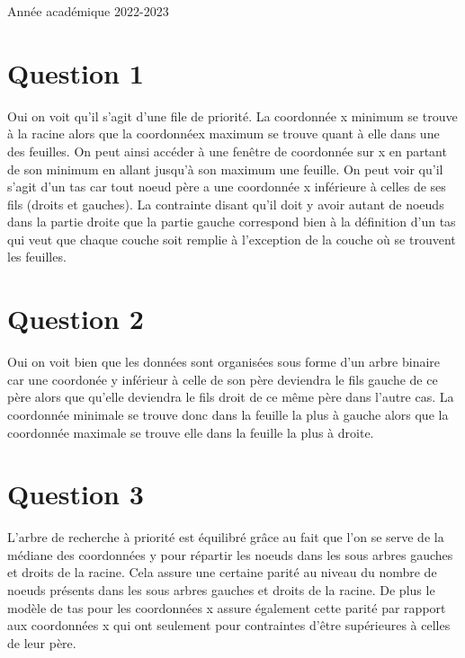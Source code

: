 \documentclass{article}
\begin{document}
\begin{titlepage}
\begin{center}
        {\large Année académique 2022-2023}
        
    \end{center}
\end{titlepage}

\tableofcontents

\newpage

\section{Question 1}
    Oui on voit qu'il s'agit d'une file de priorité. La coordonnée x minimum se trouve à la racine alors que la coordonnéex maximum se trouve quant à elle
    dans une des feuilles. On peut ainsi accéder à une fenêtre de coordonnée sur x en partant de son minimum en allant jusqu'à son maximum une feuille. 
    On peut voir qu'il s'agit d'un tas car tout noeud père a une coordonnée x inférieure à celles de ses fils (droits et gauches). La contrainte disant
    qu'il doit y avoir autant de noeuds dans la partie droite que la partie gauche correspond bien à la définition d'un tas qui veut que chaque couche
    soit remplie à l'exception de la couche où se trouvent les feuilles.

\section{Question 2}
    Oui on voit bien que les données sont organisées sous forme d'un arbre binaire car une coordonée y inférieur à celle de son père
    deviendra le fils gauche de ce père alors que qu'elle deviendra le fils droit de ce même père dans l'autre cas. La coordonnée minimale se trouve donc dans la feuille la plus à gauche 
    alors que la coordonnée maximale se trouve elle dans la feuille la plus à droite.

\section{Question 3}
    L'arbre de recherche à priorité est équilibré grâce au fait que l'on se serve de la médiane des coordonnées y pour répartir les noeuds dans les sous arbres
    gauches et droits de la racine. Cela assure une certaine parité au niveau du nombre de noeuds présents dans les sous arbres gauches et droits de la racine.
    De plus le modèle de tas pour les coordonnées x assure également cette parité par rapport aux coordonnées x qui ont seulement pour contraintes d'être
    supérieures à celles de leur père.
\end{document}
